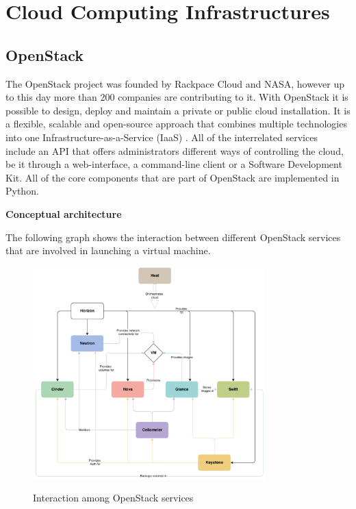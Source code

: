 \section{Cloud Computing Infrastructures}


\subsection{OpenStack}

The OpenStack project was founded by Rackpace Cloud and NASA, however up to this day  more than 200 companies are contributing to it.
With OpenStack it is possible to design, deploy and maintain a private or public cloud installation. It is a flexible, scalable and open-source approach that combines multiple technologies into one Infrastructure-as-a-Service (IaaS) \cite{openstack-ops}. All of the interrelated services include an API that offers administrators different ways of controlling the cloud, be it through a web-interface, a command-line client or a Software Development Kit. All of the core components that are part of OpenStack are implemented in Python.


\textbf{Conceptual architecture}

The following graph shows the interaction between different OpenStack services that are involved in launching a virtual machine.

\begin{figure}[H]
\centering
\includegraphics[width=0.8\textwidth]{images/fundamentals/openstack_conceptual_arch.png}
\caption{Interaction among OpenStack services}\cite{openstack-installjuno}
\end{figure}


